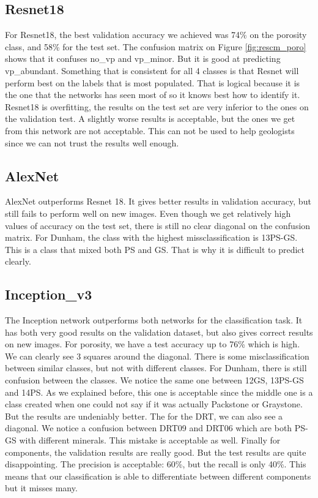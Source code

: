 \subsection{Resnet18}
For Resnet18, the best validation accuracy we achieved was 74\% on the porosity class, and 58\% for the test set. The confusion matrix on Figure \ref{fig:rescm_poro} shows that it confuses no\_vp and vp\_minor. But it is good at predicting vp\_abundant. Something that is consistent for all 4 classes is that Resnet will perform best on the labels that is most populated. That is logical because it is the one that the networks has seen most of so it knows best how to identify it. Resnet18 is overfitting, the results on the test set are very inferior to the ones on the validation test. A slightly worse results is acceptable, but the ones we get from this network are not acceptable. This can not be used to help geologists since we can not trust the results well enough.

\subsection{AlexNet}
AlexNet outperforms Resnet 18. It gives better results in validation accuracy, but still fails to perform well on new images. Even though we get relatively high values of accuracy on the test set, there is still no clear diagonal on the confusion matrix. For Dunham, the class with the highest missclassification is 13PS-GS. This is a class that mixed both PS and GS. That is why it is difficult to predict clearly. 

\subsection{Inception\_v3}
The Inception network outperforms both networks for the classification task. It has both very good results on the validation dataset, but also gives correct results on new images. For porosity, we have a test accuracy up to 76\% which is high. We can clearly see 3 squares around the diagonal. There is some misclassification between similar classes, but not with different classes. 
For Dunham, there is still confusion between the classes. We notice the same one between 12GS, 13PS-GS and 14PS. As we explained before, this one is acceptable since the middle one is a class created when one could not say if it was actually Packstone or Graystone. But the results are undeniably better. 
The  for the DRT, we can also see a diagonal. We notice a confusion between DRT09 and DRT06 which are both PS-GS with different minerals. This mistake is acceptable as well.
Finally for components, the validation results are really good. But the test results are quite disappointing. The precision is acceptable: 60\%, but the recall is only 40\%. This means that our classification is able to differentiate between different components but it misses many.

